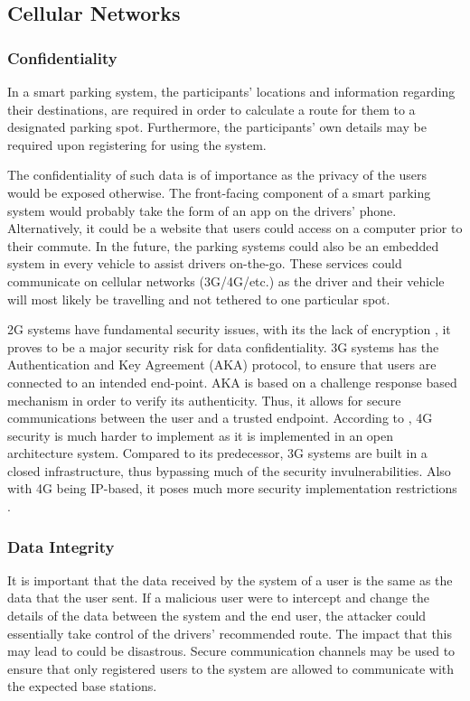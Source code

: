\subsection{Cellular Networks}
\subsubsection{Confidentiality}
In a smart parking system, the participants' locations and information regarding their destinations, are required in order to calculate a route for them to a designated parking spot. Furthermore, the participants' own details may be required upon registering for using the system.

The confidentiality of such data is of importance as the privacy of the users would be exposed otherwise. The front-facing component of a smart parking system would probably take the form of an app on the drivers' phone. Alternatively, it could be a website that users could access on a computer prior to their commute. In the future, the parking systems could also be an embedded system in every vehicle to assist drivers on-the-go. These services could communicate on cellular networks (3G/4G/etc.) as the driver and their vehicle will most likely be travelling and not tethered to one particular spot.

2G systems have fundamental security issues, with its the lack of encryption \cite{simate2013evaluation}, it proves to be a major security risk for data confidentiality. 3G systems has the Authentication and Key Agreement (AKA) protocol, to ensure that users are connected to an intended end-point. AKA is based on a challenge response based mechanism in order to verify its authenticity. Thus, it allows for secure communications between the user and a trusted endpoint. According to \cite{shirbhate2012providing}, 4G security is much harder to implement as it is implemented in an open architecture system. Compared to its predecessor, 3G systems are built in a closed infrastructure, thus bypassing much of the security invulnerabilities. Also with 4G being IP-based, it poses much more security implementation restrictions \cite{park2007survey}.

\subsubsection{Data Integrity}
It is important that the data received by the system of a user is the same as the data that the user sent. If a malicious user were to intercept and change the details of the data between the system and the end user, the attacker could essentially take control of the drivers' recommended route. The impact that this may lead to could be disastrous. Secure communication channels may be used to ensure that only registered users to the system are allowed to communicate with the expected base stations. 


